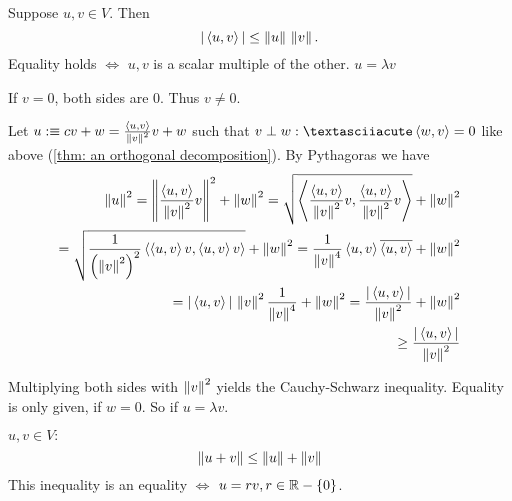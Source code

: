 \begin{thm}
  Suppose $u,v \in V$. Then
  \begin{equation}
    |\ip{u}{v}| \leq \norm{u} \, \norm{v}.
  \end{equation}
  Equality holds $\iff$ $u,v$ is a scalar multiple of the other. $u=\lambda v$
\end{thm}
\begin{prf}
  If $v=0$, both sides are $0$. Thus $v\neq0 $.
  
  Let $u :\equiv cv+w = \frac{\ip{u}{v}}{\norm{v}^2} v + w$ such that $v\perp w: ´\ip{w}{v} = 0$ like above (\autoref{thm: an orthogonal decomposition}). By Pythagoras we have
  \begin{equation}
    \begin{aligned}
      \norm{u}^2 
      = \norm{ \frac{\ip{u}{v}}{\norm{v}^2} v}^2 + \norm{w}^2 
      = \sqrt{ \ip{\frac{\ip{u}{v}}{\norm{v}^2}  v}{\frac{\ip{u}{v}}{\norm{v}^2} v}} + \norm{w}^2 \\
      = \sqrt{ \frac{1}{ \left(\norm{v}^2 \right  )^2}\ip{\ip{u}{v}v}{\ip{u}{v}v}} + \norm{w}^2 
      = \frac{1}{\norm{v}^4} \ip{u}{v} \overline{\ip{u}{v}} + \norm{w}^2 \\
      = |\ip{u}{v}| \, \norm {v}^2 \frac{1}{\norm{v}^4} + \norm{w}^2
      = \frac{|\ip{u}{v}|}{\norm{v}^2} + \norm{w}^2 \\
      \geq \frac{|\ip{u}{v}|}{\norm{v}^2}
    \end{aligned}
  \end{equation} 
  
  Multiplying both sides with $\norm{v}^2$ yields the Cauchy-Schwarz inequality. Equality is only given, if $w=0$. So if $u=\lambda v$.
\end{prf}

\setcounter{thm}{13}
\begin{thm}
  $u,v \in V:$
  \begin{equation}
    \norm{u+v} \leq \norm{u} + \norm{v}
  \end{equation}
  This inequality is an equality $\iff$ $u=rv, r\in \real - \{0\}$.
\end{thm}

